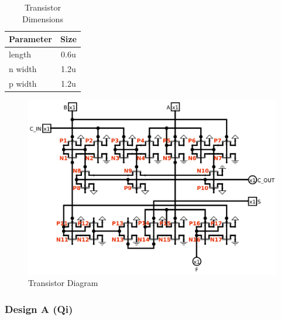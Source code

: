 \documentclass{article}
\begin{document}
\begin{table}[H]
    \centering
    \begin{tabular}{lc}
        \toprule
        \textbf{Parameter} & \textbf{Size} \\
        \midrule
        length    & 0.6u \\
        n width   & 1.2u \\
        p width   & 1.2u \\
        \bottomrule
    \end{tabular}
    \caption{Transistor Dimensions}
\end{table}
\vspace{0.5in}
\begin{figure}[H]
    \centering
    \includegraphics[width=\linewidth]{../logisim/logisim_bitslice_cmos_labeled.png}
    \caption{Transistor Diagram}
\end{figure}

\newpage
\subsubsection*{Design A (Qi)}
\end{document}
